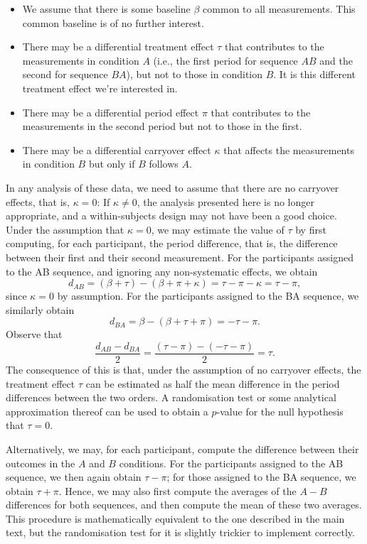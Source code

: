 \medskip

\begin{itemize}
  \item We assume that there is some baseline $\beta$ common to all measurements.
        This common baseline is of no further interest.
  
  \item There may be a differential treatment effect $\tau$
        that contributes to the measurements in condition $A$ 
        (i.e., the first period for sequence $AB$ and the second
        for sequence $BA$), but not to those in condition $B$.
        It is this different treatment effect we're interested in.
      
  \item There may be a differential period effect $\pi$ that contributes to 
        the measurements in the second period but not to those in the first.
        
  \item There may be a differential carryover effect $\kappa$ 
        that affects the measurements in condition $B$ 
        but only if $B$ follows $A$.
\end{itemize}

In any analysis of these data, 
we need to assume that there are no carryover effects, that is, $\kappa = 0$:
If $\kappa \neq 0$, 
the analysis presented here is no longer appropriate,
and a within-subjects design may not have been a good choice.
Under the assumption that $\kappa = 0$, 
we may estimate the value of $\tau$ by first computing,
for each participant, the period difference, that is, 
the difference between their first and their second measurement.
For the participants assigned to the AB sequence, and ignoring any non-systematic effects, 
we obtain
\[
  d_{AB} = (\beta + \tau) - (\beta + \pi + \kappa) = \tau - \pi - \kappa = \tau - \pi,
\]
since $\kappa = 0$ by assumption.
For the participants assigned to the BA sequence, we similarly obtain
\[
  d_{BA} = \beta - (\beta + \tau + \pi) = - \tau - \pi.
\]
Observe that
\[
  \frac{d_{AB} - d_{BA}}{2} = \frac{(\tau - \pi) - (- \tau - \pi)}{2} = \tau.
\]
The consequence of this is that, under the assumption of no carryover effects,
the treatment effect $\tau$ can be estimated as half the mean difference in the period
differences between the two orders.
A randomisation test or some analytical approximation thereof 
can be used to obtain a $p$-value for the null hypothesis
that $\tau = 0$.

\label{rem:averageofaverages}
  Alternatively, we may, for each participant, compute the difference
  between their outcomes in the $A$ and $B$ conditions.
  For the participants assigned to the AB sequence,
  we then again obtain $\tau - \pi$;
  for those assigned to the BA sequence,
  we obtain $\tau + \pi$.
  Hence, we may also first compute the averages of the $A - B$ differences
  for both sequences, and then compute the mean of these two averages.
  This procedure is mathematically equivalent to the one described in the main text,
  but the randomisation test for it is slightly trickier to implement correctly.
\parend


